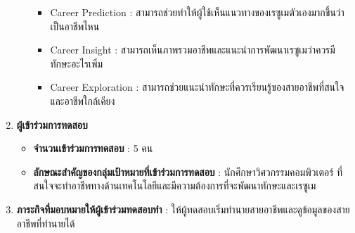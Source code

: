 \begin{enumerate}
\begin{itemize}
\begin{itemize}
                \item Career Prediction : สามารถช่วยทำให้ผู้ใช้เห็นแนวทางของเรซูเมตัวเองมากขึ้นว่าเป็นอาชีพไหน  
                \item Career Insight : สามารถเห็นภาพรวมอาชีพและแนะนำการพัฒนาเรซูเมว่าควรมีทักษะอะไรเพิ่ม 
                \item Career Exploration : สามารถช่วยแนะนำทักษะที่ควรเรียนรู้ของสายอาชีพที่สนใจและอาชีพใกล้เคียง
              \end{itemize}
          \end{itemize}
    \item \textbf{ผู้เข้าร่วมการทดสอบ}
          \begin{itemize}
              \item \textbf{จำนวนเข้าร่วมการทดสอบ} : 5 คน
              \item \textbf{ลักษณะสำคัญของกลุ่มเป้าหมายที่เข้าร่วมการทดสอบ} : นักศึกษาวิศวกรรมคอมพิวเตอร์ ที่สนใจจะทำอาชีพทางด้านเทคโนโลยีและมีความต้องการที่จะพัฒนาทักษะและเรซูเม
          \end{itemize}
    \item \textbf{ภาระกิจที่มอบหมายให้ผู้เข้าร่วมทดสอบทำ} : ให้ผู้ทดสอบเริ่มทำนายสายอาชีพและดูข้อมูลของสายอาชีพที่ทำนายได้
\end{enumerate}
